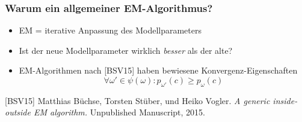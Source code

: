 \documentclass{beamer}
\begin{document}

\begin{frame}\frametitle{Warum ein allgemeiner EM-Algorithmus?}
 \begin{center}\end{center}
 \begin{itemize}
  \item EM = iterative Anpassung des Modellparameters
  \pause
  \item Ist der neue Modellparameter wirklich \emph{besser} als der alte?
  \pause
  \item EM-Algorithmen nach {\color{blue!75!black}[BSV15]} haben bewiesene Konvergenz-Eigenschaften
   \[
    \forall \omega' \in \psi(\omega)\colon
    p_{\omega'}(c) \geq p_\omega(c)
   \]
 \end{itemize}
 \scriptsize {\color{blue!75!black}[BSV15]} Matthias Büchse, Torsten Stüber, und Heiko
 Vogler. \emph{A generic inside-outside EM algorithm.} Unpublished Manuscript,
 2015.
\end{frame}
\end{document}
